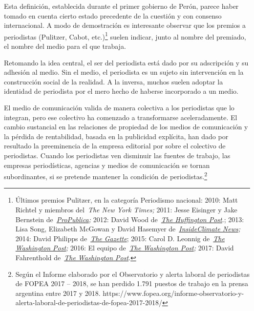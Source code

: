 {Esta definición, establecida durante el primer gobierno de Perón, parece haber tomado en cuenta cierto estado precedente de la cuestión y con consenso internacional. A modo de demostración es interesante observar que los premios a periodistas (Pulitzer, Cabot, etc.)\footnote{Últimos premios Pulitzer, en la categoría Periodismo nacional: 2010: Matt Richtel y miembros del~\emph{The New York Times;} 2011: Jesse Eisinger y Jake Bernstein de~\emph{\href{https://es.wikipedia.org/wiki/ProPublica}{ProPublica};} 2012: David Wood de~\href{https://es.wikipedia.org/wiki/HuffPost}{\emph{The Huffington Post}}.; 2013: Lisa Song, Elizabeth McGowan y David Hasemyer de~\emph{\href{https://es.wikipedia.org/w/index.php?title=InsideClimate_News\&action=edit\&redlink=1}{InsideClimate News};} 2014: David Philipps de~\href{https://es.wikipedia.org/w/index.php?title=The_Gazette_(diario)\&action=edit\&redlink=1}{\emph{The Gazette}}; 2015: Carol D. Leonnig de~\emph{\href{https://es.wikipedia.org/wiki/The_Washington_Post}{The Washington Post};} 2016: El equipo de~\emph{\href{https://es.wikipedia.org/wiki/The_Washington_Post}{The Washington Post};} 2017: David Fahrenthold de~\href{https://es.wikipedia.org/wiki/The_Washington_Post}{\emph{The Washington Post}}.} suelen indicar, junto al nombre del premiado, el nombre del medio para el que trabaja.

Retomando la idea central, el ser del periodista está dado por su adscripción y su adhesión al medio. Sin el medio, el periodista es un sujeto sin intervención en la construcción social de la realidad. A la inversa, muchos suelen adoptar la identidad de periodista por el mero hecho de haberse incorporado a un medio.

El medio de comunicación valida de manera colectiva a los periodistas que lo integran, pero ese colectivo ha comenzado a transformarse aceleradamente. El cambio sustancial en las relaciones de propiedad de los medios de comunicación y la pérdida de rentabilidad, basada en la publicidad explícita, han dado por resultado la preeminencia de la empresa editorial por sobre el colectivo de periodistas. Cuando los periodistas ven disminuir las fuentes de trabajo, las empresas periodísticas, agencias y medios de comunicación se tornan subordinantes, si se pretende mantener la condición de periodistas.\footnote{Según el Informe elaborado por el Observatorio y alerta laboral de periodistas de FOPEA 2017 -- 2018, se han perdido 1.791 puestos de trabajo en la prensa argentina entre 2017 y 2018. https://www.fopea.org/informe-observatorio-y-alerta-laboral-de-periodistas-de-fopea-2017-2018/}

}
